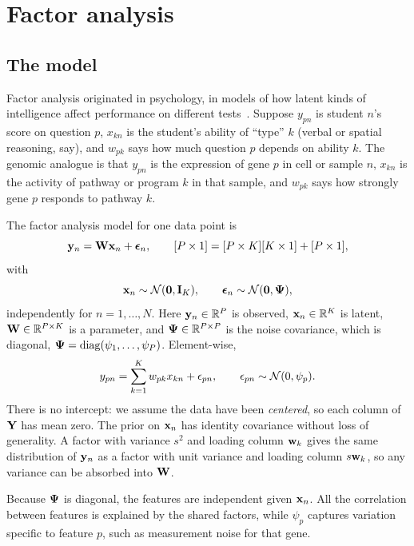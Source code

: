 \section{Factor analysis}
\label{sec:fa}

\subsection{The model}

Factor analysis originated in psychology, in models of how latent kinds of intelligence affect performance on different tests~\citep{spearman1904}. Suppose $y_{pn}$ is student $n$'s score on question $p$, $x_{kn}$ is the student's ability of ``type'' $k$ (verbal or spatial reasoning, say), and $w_{pk}$ says how much question $p$ depends on ability $k$. The genomic analogue is that $y_{pn}$ is the expression of gene $p$ in cell or sample $n$, $x_{kn}$ is the activity of pathway or program $k$ in that sample, and $w_{pk}$ says how strongly gene $p$ responds to pathway $k$.

The factor analysis model for one data point is
\begin{equation}
  \mathbf{y}_n = \mathbf{W}\mathbf{x}_n + \boldsymbol{\epsilon}_n, \qquad [P\times 1]=[P\times K][K\times 1]+[P\times 1],
  \label{eq:fa}
\end{equation}
with
\begin{equation}
  \mathbf{x}_n\sim\mathcal{N}(\mathbf{0},\mathbf{I}_K), \qquad \boldsymbol{\epsilon}_n\sim\mathcal{N}(\mathbf{0},\boldsymbol{\Psi}),
  \label{eq:fa_priors}
\end{equation}
independently for $n=1,\dots,N$. Here $\mathbf{y}_n\in\mathbb{R}^P$ is observed, $\mathbf{x}_n\in\mathbb{R}^K$ is latent, $\mathbf{W}\in\mathbb{R}^{P\times K}$ is a parameter, and $\boldsymbol{\Psi}\in\mathbb{R}^{P\times P}$ is the noise covariance, which is diagonal, $\boldsymbol{\Psi}=\operatorname{diag}(\psi_1,\dots,\psi_P)$. Element-wise,
\begin{equation}
  y_{pn}=\sum_{k=1}^K w_{pk}x_{kn}+\epsilon_{pn}, \qquad \epsilon_{pn}\sim\mathcal{N}(0,\psi_p).
\end{equation}
There is no intercept: we assume the data have been \emph{centered}, so each column of $\mathbf{Y}$ has mean zero. The prior on $\mathbf{x}_n$ has identity covariance without loss of generality. A factor with variance $s^2$ and loading column $\mathbf{w}_k$ gives the same distribution of $\mathbf{y}_n$ as a factor with unit variance and loading column $s\mathbf{w}_k$, so any variance can be absorbed into $\mathbf{W}$.

Because $\boldsymbol{\Psi}$ is diagonal, the features are independent given $\mathbf{x}_n$. All the correlation between features is explained by the shared factors, while $\psi_p$ captures variation specific to feature $p$, such as measurement noise for that gene.

